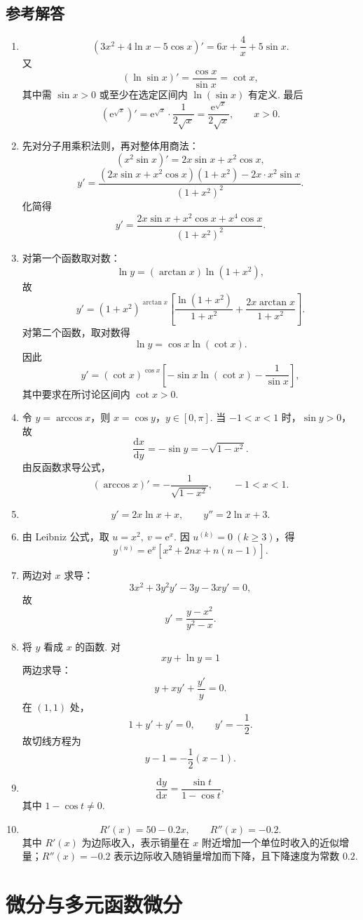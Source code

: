 \documentclass[fontset=fandol]{ctexart}
\newcounter{DefinitionCounter}[section]
\newcounter{TheoremCounter}[section]
\newcounter{PropositionCounter}[section]
\newcounter{ExampleCounter}[section]
\newcounter{ExerciseCounter}[section]
\newcounter{ProblemCounter}[section]
\newcounter{ConclusionCounter}[section]
\newcommand{\renewEnvironmentCounter}{\setcounter{DefinitionCounter}{0}\setcounter{TheoremCounter}{0}\setcounter{PropositionCounter}{0}\setcounter{ExampleCounter}{0}\setcounter{ExerciseCounter}{0}\setcounter{ProblemCounter}{0}\setcounter{ConclusionCounter}{0}}
\newcommand{\dd}{\mathrm{d}}
\newcommand{\ee}{\mathrm{e}}
\begin{document}
\subsection{参考解答}
\begin{enumerate}[label=\textbf{练习\arabic*.},leftmargin=2.2em]
\item
\[
(3x^2+4\ln x-5\cos x)'=6x+\frac4x+5\sin x.
\]
又
\[
(\ln\sin x)'=\frac{\cos x}{\sin x}=\cot x,
\]
其中需 $\sin x>0$ 或至少在选定区间内 $\ln(\sin x)$ 有定义. 最后
\[
(\ee^{\sqrt{x}})'=\ee^{\sqrt{x}}\cdot\frac1{2\sqrt{x}}
=\frac{\ee^{\sqrt{x}}}{2\sqrt{x}},\qquad x>0.
\]
\item 先对分子用乘积法则，再对整体用商法：
\[
\left(x^2\sin x\right)'=2x\sin x+x^2\cos x,
\]
\[
y'=\frac{(2x\sin x+x^2\cos x)(1+x^2)-2x\cdot x^2\sin x}{(1+x^2)^2}.
\]
化简得
\[
y'=\frac{2x\sin x+x^2\cos x+x^4\cos x}{(1+x^2)^2}.
\]
\item 对第一个函数取对数：
\[
\ln y=(\arctan x)\ln(1+x^2),
\]
故
\[
y'=(1+x^2)^{\arctan x}\left[\frac{\ln(1+x^2)}{1+x^2}+\frac{2x\arctan x}{1+x^2}\right].
\]
对第二个函数，取对数得
\[
\ln y=\cos x\ln(\cot x).
\]
因此
\[
y'=(\cot x)^{\cos x}\left[-\sin x\ln(\cot x)-\frac1{\sin x}\right],
\]
其中要求在所讨论区间内 $\cot x>0$.
\item 令 $y=\arccos x$，则 $x=\cos y$，$y\in[0,\pi]$. 当 $-1<x<1$ 时，$\sin y>0$，故
\[
\frac{\dd x}{\dd y}=-\sin y=-\sqrt{1-x^2}.
\]
由反函数求导公式，
\[
(\arccos x)'=-\frac1{\sqrt{1-x^2}},\qquad -1<x<1.
\]
\item
\[
y'=2x\ln x+x,\qquad y''=2\ln x+3.
\]
\item 由 Leibniz 公式，取 $u=x^2,\ v=\ee^x$. 因 $u^{(k)}=0\ (k\geq3)$，得
\[
y^{(n)}=\ee^x\left[x^2+2nx+n(n-1)\right].
\]
\item 两边对 $x$ 求导：
\[
3x^2+3y^2y'-3y-3xy'=0,
\]
故
\[
y'=\frac{y-x^2}{y^2-x}.
\]
\item 将 $y$ 看成 $x$ 的函数. 对
\[
xy+\ln y=1
\]
两边求导：
\[
y+xy'+\frac{y'}{y}=0.
\]
在 $(1,1)$ 处，
\[
1+y'+y'=0,\qquad y'=-\frac12.
\]
故切线方程为
\[
y-1=-\frac12(x-1).
\]
\item
\[
\frac{\dd y}{\dd x}=\frac{\sin t}{1-\cos t},
\]
其中 $1-\cos t\neq0$.
\item
\[
R'(x)=50-0.2x,\qquad R''(x)=-0.2.
\]
其中 $R'(x)$ 为边际收入，表示销量在 $x$ 附近增加一个单位时收入的近似增量；$R''(x)=-0.2$ 表示边际收入随销量增加而下降，且下降速度为常数 $0.2$.
\end{enumerate}

\section{微分与多元函数微分}
\renewEnvironmentCounter
\end{document}
